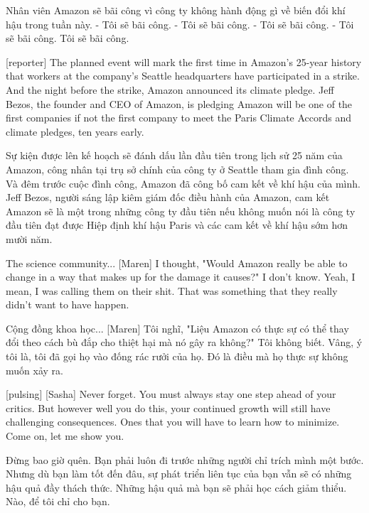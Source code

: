 \documentclass[a4paper]{article}
\begin{document}
	\begin{vietnamese-v2}
		 Nhân viên Amazon sẽ bãi công vì công ty không hành động gì về biến đổi khí hậu trong tuần này.
		- Tôi sẽ bãi công. - Tôi sẽ bãi công.
		- Tôi sẽ bãi công. - Tôi sẽ bãi công.
		Tôi sẽ bãi công.
	\end{vietnamese-v2}
	
	[reporter] The planned event will mark the first time in Amazon's 25-year history that workers at the company's Seattle headquarters have participated in a strike.
	And the night before the strike, Amazon announced its climate pledge.
	Jeff Bezos, the founder and CEO of Amazon, is pledging Amazon will be one of the first companies if not the first company to meet the Paris Climate Accords and climate pledges, ten years early.
	
	\begin{vietnamese-v2}
		 Sự kiện được lên kế hoạch sẽ đánh dấu lần đầu tiên trong lịch sử 25 năm của Amazon, công nhân tại trụ sở chính của công ty ở Seattle tham gia đình công.
		Và đêm trước cuộc đình công, Amazon đã công bố cam kết về khí hậu của mình.
		Jeff Bezos, người sáng lập kiêm giám đốc điều hành của Amazon, cam kết Amazon sẽ là một trong những công ty đầu tiên nếu không muốn nói là công ty đầu tiên đạt được Hiệp định khí hậu Paris và các cam kết về khí hậu sớm hơn mười năm.
	\end{vietnamese-v2}
	
	The science community...
	[Maren] I thought, "Would Amazon really be able to change in a way that makes up for the damage it causes?"
	I don't know.
	Yeah, I mean, I was calling them on their shit.
	That was something that they really didn't want to have happen.
	
	\begin{vietnamese-v2}
		Cộng đồng khoa học...
		[Maren] Tôi nghĩ, "Liệu Amazon có thực sự có thể thay đổi theo cách bù đắp cho thiệt hại mà nó gây ra không?"
		Tôi không biết.
		Vâng, ý tôi là, tôi đã gọi họ vào đống rác rưởi của họ.
		Đó là điều mà họ thực sự không muốn xảy ra.
	\end{vietnamese-v2}
	
	[pulsing]
	[Sasha] Never forget.
	You must always stay one step ahead of your critics.
	But however well you do this, your continued growth will still have challenging consequences.
	Ones that you will have to learn how to minimize.
	Come on, let me show you.
	
	\begin{vietnamese-v2}
		 Đừng bao giờ quên.
		Bạn phải luôn đi trước những người chỉ trích mình một bước.
		Nhưng dù bạn làm tốt đến đâu, sự phát triển liên tục của bạn vẫn sẽ có những hậu quả đầy thách thức.
		Những hậu quả mà bạn sẽ phải học cách giảm thiểu.
		Nào, để tôi chỉ cho bạn.
	\end{vietnamese-v2}
	
\end{document}

